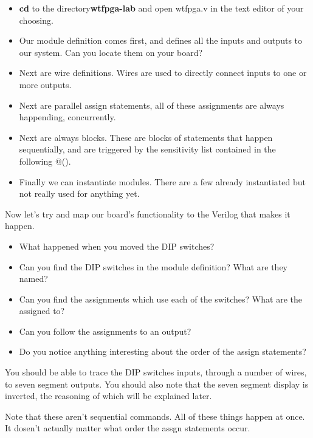 \documentclass[12pt,a4paper]{article}
\begin{document}
\begin{itemize}
	\item \textbf{cd} to the directory\textbf{wtfpga-lab} and open wtfpga.v in the text editor of your choosing.
	\item Our module definition comes first, and defines all the inputs and outputs to our system. Can you locate them on your board?
	\item Next are wire definitions. Wires are used to	directly connect inputs to one or more outputs.
	\item Next are parallel assign statements, all of these assignments are always happending, concurrently. 
	\item Next are always blocks. These are blocks of statements that happen sequentially, and are triggered by the sensitivity list contained in the following @().
	\item Finally we can instantiate modules. There are a few already instantiated but not really used for anything yet.
\end{itemize}
\noindent
Now let’s try and map our board’s functionality to the Verilog that makes it happen.
\begin{itemize}
	\item What happened when you moved the DIP switches?
	\item Can you find the DIP switches in the module definition? What are they named?
	\item Can you find the assignments which use each of the switches? What are the assigned to?
	\item Can you follow the assignments to an output?
	\item Do you notice anything interesting about the order of the assign statements?
\end{itemize}
\noindent
You should be able to trace the DIP switches inputs, through a number of wires, to seven segment outputs. You should also note that the seven segment display is inverted, the reasoning of which will be explained later. 

Note that these aren't sequential commands. All of these things happen at once. It dosen't actually matter what order the assgn statements occur. 
\newpage
\end{document}
